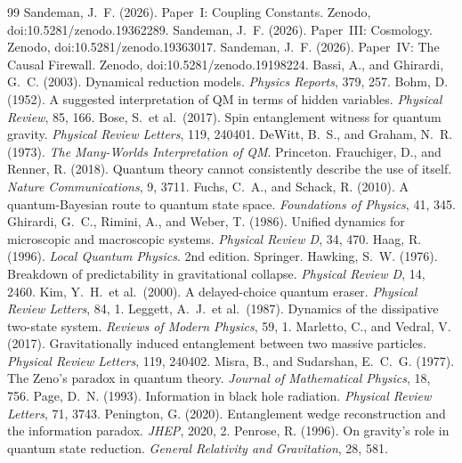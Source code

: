 \documentclass[12pt,a4paper]{article}
\begin{document}

\begin{thebibliography}{99}
 Sandeman, J.~F. (2026). Paper~I: Coupling Constants. Zenodo, doi:10.5281/zenodo.19362289.
 Sandeman, J.~F. (2026). Paper~III: Cosmology. Zenodo, doi:10.5281/zenodo.19363017.
 Sandeman, J.~F. (2026). Paper~IV: The Causal Firewall. Zenodo, doi:10.5281/zenodo.19198224.
 Bassi, A., and Ghirardi, G.~C. (2003). Dynamical reduction models. \textit{Physics Reports}, 379, 257.
 Bohm, D. (1952). A suggested interpretation of QM in terms of hidden variables. \textit{Physical Review}, 85, 166.
 Bose, S.\ et al.\ (2017). Spin entanglement witness for quantum gravity. \textit{Physical Review Letters}, 119, 240401.
 DeWitt, B.~S., and Graham, N.~R. (1973). \textit{The Many-Worlds Interpretation of QM}. Princeton.
 Frauchiger, D., and Renner, R. (2018). Quantum theory cannot consistently describe the use of itself. \textit{Nature Communications}, 9, 3711.
 Fuchs, C.~A., and Schack, R. (2010). A quantum-Bayesian route to quantum state space. \textit{Foundations of Physics}, 41, 345.
 Ghirardi, G.~C., Rimini, A., and Weber, T. (1986). Unified dynamics for microscopic and macroscopic systems. \textit{Physical Review D}, 34, 470.
 Haag, R. (1996). \textit{Local Quantum Physics}. 2nd edition. Springer.
 Hawking, S.~W. (1976). Breakdown of predictability in gravitational collapse. \textit{Physical Review D}, 14, 2460.
 Kim, Y.~H.\ et al.\ (2000). A delayed-choice quantum eraser. \textit{Physical Review Letters}, 84, 1.
 Leggett, A.~J.\ et al.\ (1987). Dynamics of the dissipative two-state system. \textit{Reviews of Modern Physics}, 59, 1.
 Marletto, C., and Vedral, V. (2017). Gravitationally induced entanglement between two massive particles. \textit{Physical Review Letters}, 119, 240402.
 Misra, B., and Sudarshan, E.~C.~G. (1977). The Zeno's paradox in quantum theory. \textit{Journal of Mathematical Physics}, 18, 756.
 Page, D.~N. (1993). Information in black hole radiation. \textit{Physical Review Letters}, 71, 3743.
 Penington, G. (2020). Entanglement wedge reconstruction and the information paradox. \textit{JHEP}, 2020, 2.
 Penrose, R. (1996). On gravity's role in quantum state reduction. \textit{General Relativity and Gravitation}, 28, 581.

\end{thebibliography}
\end{document}
